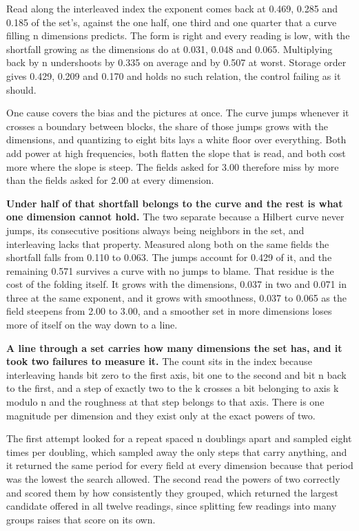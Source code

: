 Read along the interleaved index the exponent comes back at 0.469, 0.285 and 0.185 of the set's, against the one half, one third and one quarter that a curve filling n dimensions predicts. The form is right and every reading is low, with the shortfall growing as the dimensions do at 0.031, 0.048 and 0.065. Multiplying back by n undershoots by 0.335 on average and by 0.507 at worst. Storage order gives 0.429, 0.209 and 0.170 and holds no such relation, the control failing as it should.

One cause covers the bias and the pictures at once. The curve jumps whenever it crosses a boundary between blocks, the share of those jumps grows with the dimensions, and quantizing to eight bits lays a white floor over everything. Both add power at high frequencies, both flatten the slope that is read, and both cost more where the slope is steep. The fields asked for 3.00 therefore miss by more than the fields asked for 2.00 at every dimension.

\textbf{Under half of that shortfall belongs to the curve and the rest is what one dimension cannot hold.} The two separate because a Hilbert curve never jumps, its consecutive positions always being neighbors in the set, and interleaving lacks that property. Measured along both on the same fields the shortfall falls from 0.110 to 0.063. The jumps account for 0.429 of it, and the remaining 0.571 survives a curve with no jumps to blame. That residue is the cost of the folding itself. It grows with the dimensions, 0.037 in two and 0.071 in three at the same exponent, and it grows with smoothness, 0.037 to 0.065 as the field steepens from 2.00 to 3.00, and a smoother set in more dimensions loses more of itself on the way down to a line.

\textbf{A line through a set carries how many dimensions the set has, and it took two failures to measure it.} The count sits in the index because interleaving hands bit zero to the first axis, bit one to the second and bit n back to the first, and a step of exactly two to the k crosses a bit belonging to axis k modulo n and the roughness at that step belongs to that axis. There is one magnitude per dimension and they exist only at the exact powers of two.

The first attempt looked for a repeat spaced n doublings apart and sampled eight times per doubling, which sampled away the only steps that carry anything, and it returned the same period for every field at every dimension because that period was the lowest the search allowed. The second read the powers of two correctly and scored them by how consistently they grouped, which returned the largest candidate offered in all twelve readings, since splitting few readings into many groups raises that score on its own.

